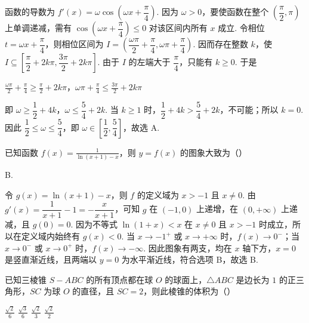 \begin{solution}
函数的导数为 \(f'(x)=\omega\cos\left(\omega x+\dfrac\pi4\right)\). 因为 \(\omega>0\)，要使函数在整个 \(\left(\dfrac\pi2,\pi\right)\) 上单调递减，需有 \(\cos\left(\omega x+\dfrac\pi4\right)\leqslant0\) 对该区间内所有 \(x\) 成立. 令相位 \(t=\omega x+\dfrac\pi4\)，则相位区间为 \(I=\left(\dfrac{\omega\pi}{2}+\dfrac\pi4,\omega\pi+\dfrac\pi4\right)\). 因而存在整数 \(k\)，使 \(I\subseteq\left[\dfrac\pi2+2k\pi,\dfrac{3\pi}{2}+2k\pi\right]\). 由于 \(I\) 的左端大于 \(\dfrac\pi4\)，只能有 \(k\geqslant0\). 于是

\(\frac{\omega\pi}{2}+\frac\pi4\geqslant\frac\pi2+2k\pi\)，\(\omega\pi+\frac\pi4\leqslant\frac{3\pi}{2}+2k\pi\)

即 \(\omega\geqslant\dfrac12+4k\)，\(\omega\leqslant\dfrac54+2k\). 当 \(k\geqslant1\) 时，\(\dfrac12+4k>\dfrac54+2k\)，不可能；所以 \(k=0\). 因此 \(\dfrac12\leqslant\omega\leqslant\dfrac54\)，即 \(\omega\in\left[\dfrac12,\dfrac54\right]\)，故选 A.
\end{solution}

\begin{problem}
已知函数 \( f(x) = \frac{1}{\ln (x + 1) - x} \)，则 \( y = f(x) \) 的图象大致为（\quad）

    {}
    {}
    {}
\end{problem}

\begin{answer}
B.
\end{answer}

\begin{solution}
令 \(g(x)=\ln(x+1)-x\)，则 \(f\) 的定义域为 \(x>-1\) 且 \(x\ne0\). 由 \(g'(x)=\dfrac1{x+1}-1=-\dfrac{x}{x+1}\)，可知 \(g\) 在 \((-1,0)\) 上递增，在 \((0,+\infty)\) 上递减，且 \(g(0)=0\). 因为不等式 \(\ln(1+x)<x\) 在 \(x\ne0\) 且 \(x>-1\) 时成立，所以在定义域内始终有 \(g(x)<0\). 当 \(x\to-1^+\) 或 \(x\to+\infty\) 时，\(f(x)\to0^-\)；当 \(x\to0^-\) 或 \(x\to0^+\) 时，\(f(x)\to-\infty\). 因此图象有两支，均在 \(x\) 轴下方，\(x=0\) 是竖直渐近线，且两端以 \(y=0\) 为水平渐近线，符合选项 B，故选 B.
\end{solution}

\begin{problem}
已知三棱锥 \(S - ABC\) 的所有顶点都在球 \(O\) 的球面上，\(\triangle ABC\) 是边长为 \(1\) 的正三角形，\(SC\) 为球 \(O\) 的直径，且 \(SC = 2\)，则此棱锥的体积为（\quad）

\choices
    {\(\frac{\sqrt{2}}{6}\)}
    {\( \frac{\sqrt{3}}{6} \)}
    {\( \frac{\sqrt{2}}{3} \)}
    {\( \frac{\sqrt{2}}{2} \)}
\end{problem}


